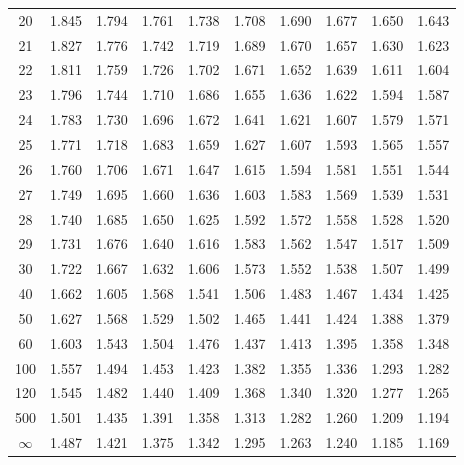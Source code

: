 \documentclass[12pt]{article}
\begin{document}
\begin{table}
\begin{center}
{\begin{tabular}{|c|c|c|c|c|c|c|c|c|c|}
20 & 1.845 &1.794 &1.761 &1.738 &1.708 &1.690 &1.677 &1.650 &1.643\\
21 & 1.827 &1.776 &1.742 &1.719 &1.689 &1.670 &1.657 &1.630 &1.623\\
22 & 1.811 &1.759 &1.726 &1.702 &1.671 &1.652 &1.639 &1.611 &1.604\\
23 & 1.796 &1.744 &1.710 &1.686 &1.655 &1.636 &1.622 &1.594 &1.587\\
24 & 1.783 &1.730 &1.696 &1.672 &1.641 &1.621 &1.607 &1.579 &1.571\\
25 & 1.771 &1.718 &1.683 &1.659 &1.627 &1.607 &1.593 &1.565 &1.557\\
26 & 1.760 &1.706 &1.671 &1.647 &1.615 &1.594 &1.581 &1.551 &1.544\\
27 & 1.749 &1.695 &1.660 &1.636 &1.603 &1.583 &1.569 &1.539 &1.531\\
28 & 1.740 &1.685 &1.650 &1.625 &1.592 &1.572 &1.558 &1.528 &1.520\\
29 & 1.731 &1.676 &1.640 &1.616 &1.583 &1.562 &1.547 &1.517 &1.509\\
30 & 1.722 &1.667 &1.632 &1.606 &1.573 &1.552 &1.538 &1.507 &1.499\\
40 & 1.662 &1.605 &1.568 &1.541 &1.506 &1.483 &1.467 &1.434 &1.425\\
50 & 1.627 &1.568 &1.529 &1.502 &1.465 &1.441 &1.424 &1.388 &1.379\\
60 & 1.603 &1.543 &1.504 &1.476 &1.437 &1.413 &1.395 &1.358 &1.348\\
100 & 1.557 &1.494 &1.453 &1.423 &1.382 &1.355 &1.336 &1.293 &1.282\\
120 & 1.545 &1.482 &1.440 &1.409 &1.368 &1.340 &1.320 &1.277 &1.265\\
500 & 1.501 &1.435 &1.391 &1.358 &1.313 &1.282 &1.260 &1.209 &1.194\\ \hline
$\infty$ & 1.487 &1.421 &1.375 &1.342 &1.295 &1.263 &1.240 &1.185 &1.169\\
  \hline
\end{tabular}
}
\end{center}
\end{table}

\end{document}
